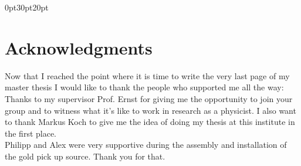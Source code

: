 \documentclass[parskip,12pt,headsepline,a4paper] {scrbook}
\begin{document}


















\newpage
{} \label{listoffig}
\listoffigures

\newpage
{} \label{listoftab}
\listoftables

\newpage
{} \label{bibliography}





\newpage
{} \label{acknow}
\titlespacing*{\chapter} {0pt}{30pt}{20pt}
\chapter*{Acknowledgments}
Now that I reached the point where it is time to write the very last page of my master thesis I would like to thank the people who supported me all the way: Thanks to my supervisor Prof. Ernst for giving me the opportunity to join your group and to witness what it's like to work in research as a physicist. I also want to thank Markus Koch to give me the idea of doing my thesis at this institute in the first place. \\
Philipp and Alex were very supportive during the assembly and installation of the gold pick up source. Thank you for that.
\end{document}
